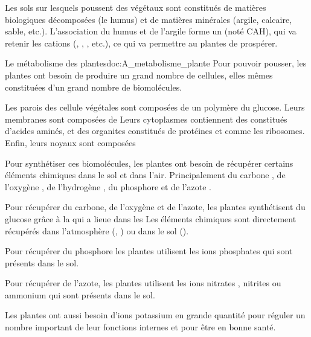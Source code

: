 \tetePremStssAlim
\vspace*{-24pt}

\begin{contexte}
  Les sols sur lesquels poussent des végétaux sont constitués de matières biologiques décomposées (le humus) et de matières minérales (argile, calcaire, sable, etc.).
  L'association du humus et de l'argile forme un  (noté CAH), qui va retenir les cations (\ionPotassium, \ionSodium, \ammonium, etc.), ce qui va permettre au plantes de prospérer.

\end{contexte}

\begin{doc}{Le métabolisme des plantes}{doc:A_metabolisme_plante}
  Pour pouvoir pousser, les plantes ont besoin de produire un grand nombre de cellules, elles mêmes constituées d'un grand nombre de biomolécules.

  \begin{importants}
    Les parois des cellule végétales sont composées de  un polymère du glucose.
    Leurs membranes sont composées de  
    Leurs cytoplasmes contiennent des  constitués d'acides aminés, et des organites constitués de protéines et  comme les ribosomes.
    Enfin, leurs noyaux sont composées 
  \end{importants}

  Pour synthétiser ces biomolécules, les plantes ont besoin de récupérer certains éléments chimiques dans le sol et dans l'air.
  Principalement du carbone \carbone, de l'oxygène \oxygene, de l'hydrogène \hydrogene, du phosphore \phosphore et de l'azote \azote.

  \begin{listePoints}
    \item Pour récupérer du carbone, de l'oxygène et de l'azote, les plantes synthétisent du glucose grâce à la  qui a lieue dans les 
    Les éléments chimiques sont directement récupérés dans l'atmosphère (\dioxydeDeCarbone, \eau) ou dans le sol (\eau).
  
    \item Pour récupérer du phosphore les plantes utilisent les ions phosphates \ionPhosphate qui sont présents dans le sol.
  
    \item Pour récupérer de l'azote, les plantes utilisent les ions nitrates \nitrate, nitrites \nitrite ou ammonium \ammonium qui sont présents dans le sol.
  \end{listePoints}
  Les plantes ont aussi besoin d'ions potassium \ionPotassium en grande quantité pour réguler un nombre important de leur fonctions internes et pour être en bonne santé.
\end{doc}

